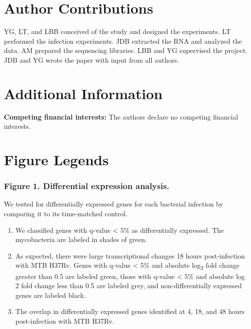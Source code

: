 \section{Author Contributions}\label{author-contributions}

YG, LT, and LBB conceived of the study and designed the experiments. LT
performed the infection experiments. JDB extracted the RNA and analyzed
the data. AM prepared the sequencing libraries. LBB and YG supervised
the project. JDB and YG wrote the paper with input from all authors.

\section{Additional Information}\label{additional-information}

\textbf{Competing financial interests:} The authors declare no competing
financial interests.

\section{Figure Legends}\label{figure-legends}

\subsubsection{Figure 1. Differential expression
analysis.}\label{figure-1.-differential-expression-analysis.}

We tested for differentially expressed genes for each bacterial
infection by comparing it to its time-matched control.

\begin{enumerate}
\def\labelenumi{(\Alph{enumi})}
\itemsep1pt\parskip0pt
\item
  We classified genes with q-value \textless{} 5\% as differentially
  expressed. The mycobacteria are labeled in shades of green.
\item
  As expected, there were large transcriptional changes 18 hours
  post-infection with MTB H37Rv. Genes with q-value \textless{} 5\% and
  absolute log\textsubscript{2} fold change greater than 0.5 are labeled
  green, those with q-value \textless{} 5\% and absolute log 2 fold
  change less than 0.5 are labeled grey, and non-differentially
  expressed genes are labeled black.
\item
  The overlap in differentially expressed genes identified at 4, 18, and
  48 hours post-infection with MTB H37Rv.
\end{enumerate}

